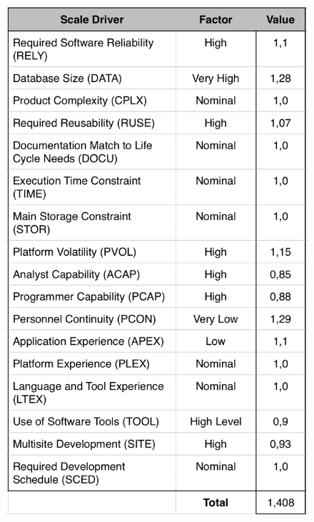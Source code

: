\documentclass[a4paper,10pt]{article}
\begin{document}
        \begin{figure}[!h]
  \centering

    \includegraphics[scale=0.40]{Resources/cocomo/resume2.png}
  \end{figure}\FloatBarrier
\end{document}
